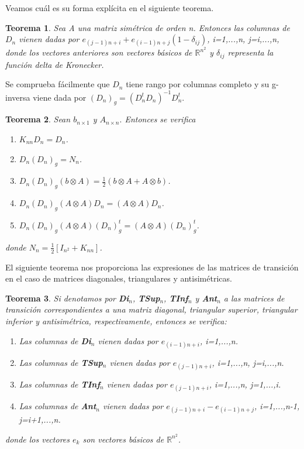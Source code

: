 \documentclass{article}
\theoremstyle{theorem-style}  %
\newtheorem{theorem}{Teorema}[section]  %
\theoremstyle{definition-style}
\theoremstyle{example-style}
\theoremstyle{exercise-style}
\begin{document}
	Veamos cuál es su forma explícita en el siguiente teorema.
	
	\begin{theorem}
		Sea A una matriz simétrica de orden n. Entonces las columnas de $D_n$ vienen dadas por $e_{(j-1)n+i}+e_{(i-1)n+j}(1-\delta_{ij})$, i=1,...,n, j=i,...,n, donde los vectores anteriores son vectores básicos de $\mathbb{R}^{n^2}$ y $\delta_{ij}$ representa la función delta de Kronecker.
	\end{theorem}
	
	Se comprueba fácilmente que $D_n$ tiene rango por columnas completo y su g-inversa viene dada por $(D_n)_g = (D^t_nD_n)^{-1}D_n^t$.
	
	\begin{theorem}
		Sean $b_{n\times 1}$ y $A_{n\times n}.$ Entonces se verifica
		\begin{enumerate}
			\item $K_{nn}D_n = D_n$.
			\item $D_n(D_n)_g=N_n$.
			\item $D_n(D_n)_g(b\otimes A) = \frac{1}{2}(b\otimes A + A\otimes b)$.
			\item $D_n(D_n)_g(A\otimes A)D_n = (A\otimes A)D_n$.
			\item $D_n(D_n)_g(A\otimes A)(D_n)_g^t = (A\otimes A)(D_n)^t_g$.
		\end{enumerate}
		donde $N_n = \frac{1}{2}[I_{n^2}+K_{nn}]$.
	\end{theorem}
	
	El siguiente teorema nos proporciona las expresiones de las matrices de transición en el caso de matrices diagonales, triangulares y antisimétricas.
	
	\begin{theorem}
		Si denotamos por \textbf{Di$_n$}, \textbf{TSup$_n$}, \textbf{TInf$_n$} y \textbf{Ant$_n$} a las matrices de transición correspondientes a una matriz diagonal, triangular superior, triangular inferior y antisimétrica, respectivamente, entonces se verifica:
		\begin{enumerate}
			\item Las columnas de \textbf{Di$_n$} vienen dadas por $e_{(i-1)n+i}$, i=1,...,n.
			\item Las columnas de \textbf{TSup$_n$} vienen dadas por $e_{(j-1)n+i}$, i=1,...,n, j=i,...,n.
			\item Las columnas de \textbf{TInf$_n$} vienen dadas por $e_{(j-1)n+i}$, i=1,...,n, j=1,...,i.
			\item Las columnas de \textbf{Ant$_n$} vienen dadas por $e_{(j-1)n+i}-e_{(i-1)n+j}$, i=1,...,n-1, j=i+1,...,n.
		\end{enumerate}
		donde los vectores $e_k$ son vectores básicos de $\mathbb{R}^{n^2}$.
	\end{theorem}
	
\end{document}
